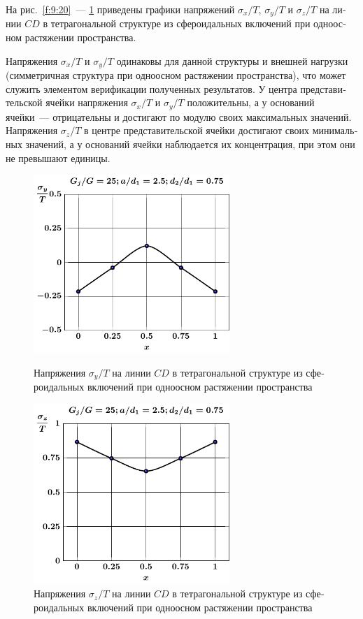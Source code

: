 \begin{russian}
На рис.~\ref{f:9:20}~--- \ref{f:9:22} приведены графики напряжений $\sigma_x/T$, $\sigma_y/T$ и $\sigma_z/T$ на линии $CD$ в тетрагональной структуре из сфероидальных включений при одноосном растяжении пространства.{\sloppy\par}

Напряжения $\sigma_x/T$ и $\sigma_y/T$ одинаковы для данной структуры и внешней нагрузки (симметричная структура при одноосном растяжении пространства), что может служить элементом верификации полученных результатов. У центра представительской ячейки напряжения $\sigma_x/T$ и $\sigma_y/T$ положительны, а у оснований ячейки~--- отрицательны и достигают по модулю своих максимальных значений. Напряжения $\sigma_z/T$ в центре представительской ячейки достигают своих минимальных значений, а у оснований ячейки наблюдается их концентрация, при этом они не превышают единицы.

\begin{figure}[h!]
\centering\footnotesize
\parbox[b]{7.5cm}{\centering\includegraphics[width=7.4cm]{inc8-a25-d75-g25-c-c-sig_y-spheroids-tension1.pdf}
\caption{Напряжения $\sigma_y/T$ на линии $CD$ в тетрагональной структуре из сфероидальных включений при одноосном растяжении пространства
\label{f:9:21}}}\hfil\hfil
\parbox[b]{7.5cm}{\centering\includegraphics[width=7.4cm]{inc8-a25-d75-g25-c-c-sig_z-spheroids-tension1.pdf}
\caption{Напряжения $\sigma_z/T$ на линии $CD$ в тетрагональной структуре из сфероидальных включений при одноосном растяжении пространства
\label{f:9:22}}}
\end{figure}


\end{russian}
